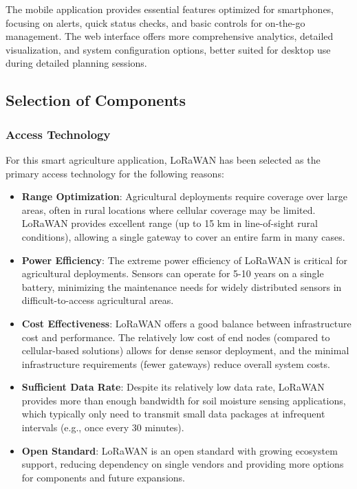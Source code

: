 \documentclass[12pt,a4paper]{article}
\begin{document}
The mobile application provides essential features optimized for smartphones, focusing on alerts, quick status checks, and basic controls for on-the-go management. The web interface offers more comprehensive analytics, detailed visualization, and system configuration options, better suited for desktop use during detailed planning sessions.

\subsection{Selection of Components}

\subsubsection{Access Technology}

For this smart agriculture application, LoRaWAN has been selected as the primary access technology for the following reasons:

\begin{itemize}
    \item \textbf{Range Optimization}: Agricultural deployments require coverage over large areas, often in rural locations where cellular coverage may be limited. LoRaWAN provides excellent range (up to 15 km in line-of-sight rural conditions), allowing a single gateway to cover an entire farm in many cases.
    
    \item \textbf{Power Efficiency}: The extreme power efficiency of LoRaWAN is critical for agricultural deployments. Sensors can operate for 5-10 years on a single battery, minimizing the maintenance needs for widely distributed sensors in difficult-to-access agricultural areas.
    
    \item \textbf{Cost Effectiveness}: LoRaWAN offers a good balance between infrastructure cost and performance. The relatively low cost of end nodes (compared to cellular-based solutions) allows for dense sensor deployment, and the minimal infrastructure requirements (fewer gateways) reduce overall system costs.
    
    \item \textbf{Sufficient Data Rate}: Despite its relatively low data rate, LoRaWAN provides more than enough bandwidth for soil moisture sensing applications, which typically only need to transmit small data packages at infrequent intervals (e.g., once every 30 minutes).
    
    \item \textbf{Open Standard}: LoRaWAN is an open standard with growing ecosystem support, reducing dependency on single vendors and providing more options for components and future expansions.
\end{itemize}
\end{document}
